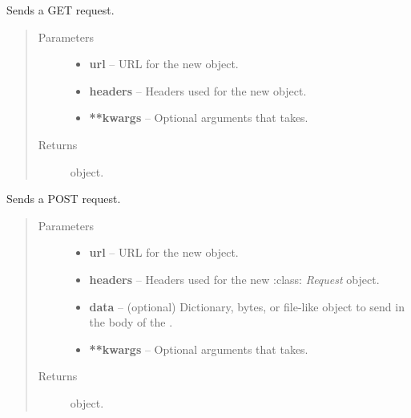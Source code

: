\documentclass[letterpaper,10pt,english]{sphinxmanual}
\begin{document}
\begin{fulllineitems}
\label{web_portal:core.courses.utils.send_get_request}
Sends a GET request.
\begin{quote}\begin{description}
\item[{Parameters}] \leavevmode\begin{itemize}
\item {} 
\textbf{url} -- URL for the new  object.

\item {} 
\textbf{headers} -- Headers used for the new  object.

\item {} 
\textbf{**kwargs} -- Optional arguments that  takes.

\end{itemize}

\item[{Returns}] \leavevmode
{} object.

\end{description}\end{quote}

\end{fulllineitems}


\begin{fulllineitems}
\label{web_portal:core.courses.utils.send_post_request}
Sends a POST request.
\begin{quote}\begin{description}
\item[{Parameters}] \leavevmode\begin{itemize}
\item {} 
\textbf{url} -- URL for the new  object.

\item {} 
\textbf{headers} -- Headers used for the new :class: \emph{Request} object.

\item {} 
\textbf{data} -- (optional) Dictionary, bytes, or file-like object to send in the body of the .

\item {} 
\textbf{**kwargs} -- Optional arguments that  takes.

\end{itemize}

\item[{Returns}] \leavevmode
{} object.

\end{description}\end{quote}

\end{fulllineitems}
\end{document}
